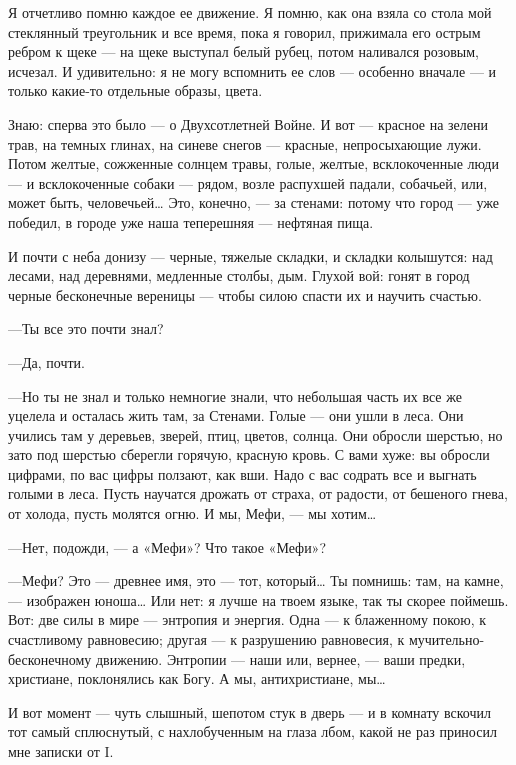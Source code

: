 \documentclass[11pt,openany]{book}
\begin{document}
Я отчетливо помню каждое ее движение. Я помню, как она взяла со стола мой стеклянный треугольник и все время, пока я говорил, прижимала его острым ребром к щеке --- на щеке выступал белый рубец, потом наливался розовым, исчезал. И удивительно: я не могу вспомнить ее слов --- особенно вначале --- и только какие-то отдельные образы, цвета.

Знаю: сперва это было --- о Двухсотлетней Войне. И вот --- красное на зелени трав, на темных глинах, на синеве снегов --- красные, непросыхающие лужи. Потом желтые, сожженные солнцем травы, голые, желтые, всклокоченные люди --- и всклокоченные собаки --- рядом, возле распухшей падали, собачьей, или, может быть, человечьей\ldots{} Это, конечно, --- за стенами: потому что город --- уже победил, в городе уже наша теперешняя --- нефтяная пища.

И почти с неба донизу --- черные, тяжелые складки, и складки колышутся: над лесами, над деревнями, медленные столбы, дым. Глухой вой: гонят в город черные бесконечные вереницы --- чтобы силою спасти их и научить счастью.

---Ты все это почти знал?

---Да, почти.

---Но ты не знал и только немногие знали, что небольшая часть их все же уцелела и осталась жить там, за Стенами. Голые --- они ушли в леса. Они учились там у деревьев, зверей, птиц, цветов, солнца. Они обросли шерстью, но зато под шерстью сберегли горячую, красную кровь. С вами хуже: вы обросли цифрами, по вас цифры ползают, как вши. Надо с вас содрать все и выгнать голыми в леса. Пусть научатся дрожать от страха, от радости, от бешеного гнева, от холода, пусть молятся огню. И мы, Мефи, --- мы хотим\ldots{}

---Нет, подожди, --- а «Мефи»? Что такое «Мефи»?

---Мефи? Это --- древнее имя, это --- тот, который\ldots{} Ты помнишь: там, на камне, --- изображен юноша\ldots{} Или нет: я лучше на твоем языке, так ты скорее поймешь. Вот: две силы в мире --- энтропия и энергия. Одна --- к блаженному покою, к счастливому равновесию; другая --- к разрушению равновесия, к мучительно-бесконечному движению. Энтропии --- наши или, вернее, --- ваши предки, христиане, поклонялись как Богу. А мы, антихристиане, мы\ldots{}

И вот момент --- чуть слышный, шепотом стук в дверь --- и в комнату вскочил тот самый сплюснутый, с нахлобученным на глаза лбом, какой не раз приносил мне записки от I.
\end{document}
